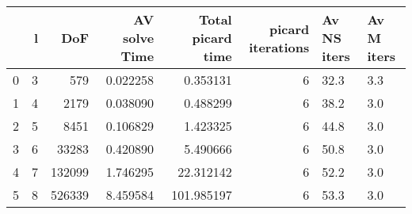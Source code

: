 \begin{tabular}{lrrrrrll}
\toprule
{} &  l &     DoF &  AV solve Time &  Total picard time &  picard iterations & Av NS iters & Av M iters \\
\midrule
0 &  3 &     579 &       0.022258 &           0.353131 &                  6 &        32.3 &        3.3 \\
1 &  4 &    2179 &       0.038090 &           0.488299 &                  6 &        38.2 &        3.0 \\
2 &  5 &    8451 &       0.106829 &           1.423325 &                  6 &        44.8 &        3.0 \\
3 &  6 &   33283 &       0.420890 &           5.490666 &                  6 &        50.8 &        3.0 \\
4 &  7 &  132099 &       1.746295 &          22.312142 &                  6 &        52.2 &        3.0 \\
5 &  8 &  526339 &       8.459584 &         101.985197 &                  6 &        53.3 &        3.0 \\
\bottomrule
\end{tabular}
